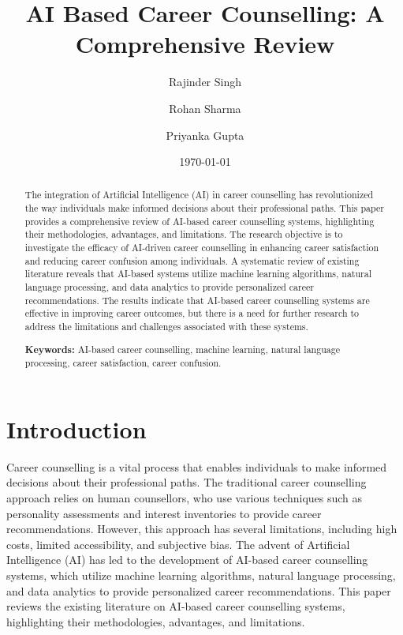 \documentclass[12pt,a4paper]{article}
\title{AI Based Career Counselling: A Comprehensive Review}
\author{Rajinder Singh \and Rohan Sharma \and Priyanka Gupta}
\date{\today}
\begin{document}
\maketitle
\thispagestyle{empty}

\begin{abstract}
The integration of Artificial Intelligence (AI) in career counselling has revolutionized the way individuals make informed decisions about their professional paths. This paper provides a comprehensive review of AI-based career counselling systems, highlighting their methodologies, advantages, and limitations. The research objective is to investigate the efficacy of AI-driven career counselling in enhancing career satisfaction and reducing career confusion among individuals. A systematic review of existing literature reveals that AI-based systems utilize machine learning algorithms, natural language processing, and data analytics to provide personalized career recommendations. The results indicate that AI-based career counselling systems are effective in improving career outcomes, but there is a need for further research to address the limitations and challenges associated with these systems. 

\textbf{Keywords:} AI-based career counselling, machine learning, natural language processing, career satisfaction, career confusion.
\end{abstract}

\newpage
\tableofcontents
\newpage

\section{Introduction}
Career counselling is a vital process that enables individuals to make informed decisions about their professional paths. The traditional career counselling approach relies on human counsellors, who use various techniques such as personality assessments and interest inventories to provide career recommendations. However, this approach has several limitations, including high costs, limited accessibility, and subjective bias. The advent of Artificial Intelligence (AI) has led to the development of AI-based career counselling systems, which utilize machine learning algorithms, natural language processing, and data analytics to provide personalized career recommendations. This paper reviews the existing literature on AI-based career counselling systems, highlighting their methodologies, advantages, and limitations.
\end{document}
